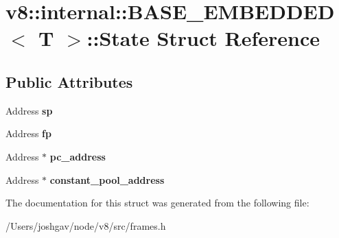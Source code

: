 \hypertarget{structv8_1_1internal_1_1_b_a_s_e___e_m_b_e_d_d_e_d_1_1_state}{}\section{v8\+:\+:internal\+:\+:B\+A\+S\+E\+\_\+\+E\+M\+B\+E\+D\+D\+ED$<$ T $>$\+:\+:State Struct Reference}
\label{structv8_1_1internal_1_1_b_a_s_e___e_m_b_e_d_d_e_d_1_1_state}
\subsection*{Public Attributes}
\begin{DoxyCompactItemize}
\item 
Address {\bfseries sp}\hypertarget{structv8_1_1internal_1_1_b_a_s_e___e_m_b_e_d_d_e_d_1_1_state_a0eaaff1b733b5c86caa52dd0f5fa91eb}{}\label{structv8_1_1internal_1_1_b_a_s_e___e_m_b_e_d_d_e_d_1_1_state_a0eaaff1b733b5c86caa52dd0f5fa91eb}

\item 
Address {\bfseries fp}\hypertarget{structv8_1_1internal_1_1_b_a_s_e___e_m_b_e_d_d_e_d_1_1_state_ac1793af58bcbc3775b4db5e12d126a5d}{}\label{structv8_1_1internal_1_1_b_a_s_e___e_m_b_e_d_d_e_d_1_1_state_ac1793af58bcbc3775b4db5e12d126a5d}

\item 
Address $\ast$ {\bfseries pc\+\_\+address}\hypertarget{structv8_1_1internal_1_1_b_a_s_e___e_m_b_e_d_d_e_d_1_1_state_ac706de06bc6b62fb4f0b7e1663092e88}{}\label{structv8_1_1internal_1_1_b_a_s_e___e_m_b_e_d_d_e_d_1_1_state_ac706de06bc6b62fb4f0b7e1663092e88}

\item 
Address $\ast$ {\bfseries constant\+\_\+pool\+\_\+address}\hypertarget{structv8_1_1internal_1_1_b_a_s_e___e_m_b_e_d_d_e_d_1_1_state_a5e4e1bed48f9552d5cfc13558af5fc15}{}\label{structv8_1_1internal_1_1_b_a_s_e___e_m_b_e_d_d_e_d_1_1_state_a5e4e1bed48f9552d5cfc13558af5fc15}

\end{DoxyCompactItemize}


The documentation for this struct was generated from the following file\+:\begin{DoxyCompactItemize}
\item 
/\+Users/joshgav/node/v8/src/frames.\+h\end{DoxyCompactItemize}
